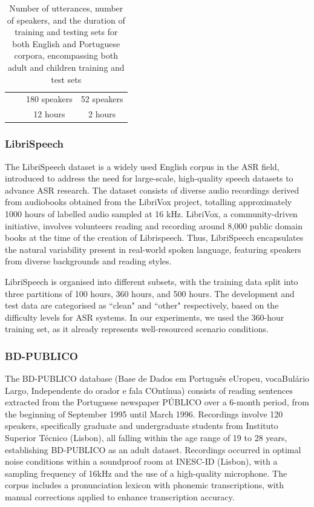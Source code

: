 \begin{table}[h]
\begin{center}
\begin{tabular}{cccc}
                                &                                                                              & 180 speakers      & 52 speakers     \\
                                &                                                                              & 12 hours          & 2 hours         \\ \hline
    \end{tabular}
    \caption{Number of utterances, number of speakers, and the duration of training and testing sets for both English and Portuguese corpora, encompassing both adult and children training and test sets}
\label{tab:statistics_exp1}
\end{center}

    \end{table}


\subsubsection*{LibriSpeech}
The LibriSpeech dataset \cite{librispeech} is a widely used English corpus in the \ac{ASR} field, introduced to address the need for large-scale, high-quality speech datasets to advance \ac{ASR} research. The dataset consists of diverse audio recordings derived from audiobooks obtained from the LibriVox project, totalling approximately 1000 hours of labelled audio sampled at 16 k\ac{Hz}. LibriVox, a community-driven initiative, involves volunteers reading and recording around 8,000 public domain books at the time of the creation of Librispeech. Thus, LibriSpeech encapsulates the natural variability present in real-world spoken language, featuring speakers from diverse backgrounds and reading styles.

LibriSpeech is organised into different subsets, with the training data split into three partitions of 100 hours, 360 hours, and 500 hours. The development and test data are categorised as ``clean" and ``other" respectively, based on the difficulty levels for \ac{ASR} systems. In our experiments, we used the 360-hour training set, as it already represents well-resourced scenario conditions.


\subsubsection*{BD-PUBLICO}
The BD-PUBLICO database (Base de Dados em Português eUropeu, vocaBulário Largo, Independente do orador e fala COntínua) \cite{bdpublico} consists of reading sentences extracted from the Portuguese newspaper PÚBLICO over a 6-month period, from the beginning of September 1995 until March 1996. Recordings involve 120 speakers, specifically graduate and undergraduate students from Instituto Superior Técnico (Lisbon), all falling within the age range of 19 to 28 years, establishing BD-PUBLICO as an adult dataset. Recordings occurred in optimal noise conditions within a soundproof room at INESC-ID (Lisbon), with a sampling frequency of 16kHz and the use of a high-quality microphone. The corpus includes a pronunciation lexicon with phonemic transcriptions, with manual corrections applied to enhance transcription accuracy.

